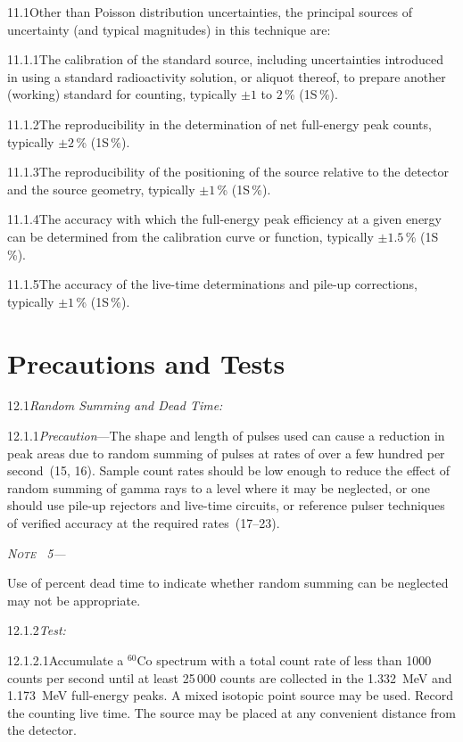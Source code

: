 \documentclass[12pt]{article}
\newenvironment{astmnote}[1][\relax]{%
  \par\smallskip\noindent\textit{N\textsc{ote}%
  \ifx#1\relax\else~#1\fi---}\ignorespaces
}{%
  \par\smallskip
}
\begin{document}
11.1\quad Other than Poisson distribution uncertainties, the principal sources of
uncertainty (and typical magnitudes) in this technique are:

11.1.1\quad The calibration of the standard source, including uncertainties introduced in
using a standard radioactivity solution, or aliquot thereof, to prepare another (working)
standard for counting, typically $\pm 1$ to $2$\,\% (1S\,\%).

11.1.2\quad The reproducibility in the determination of net full-energy peak counts,
typically $\pm 2$\,\% (1S\,\%).

11.1.3\quad The reproducibility of the positioning of the source relative to the detector
and the source geometry, typically $\pm 1$\,\% (1S\,\%).

11.1.4\quad The accuracy with which the full-energy peak efficiency at a given energy can
be determined from the calibration curve or function, typically $\pm 1.5$\,\% (1S\,\%).

11.1.5\quad The accuracy of the live-time determinations and pile-up corrections,
typically $\pm 1$\,\% (1S\,\%).

\section{Precautions and Tests}

12.1\quad \textit{Random Summing and Dead Time:}

12.1.1\quad \textit{Precaution}---The shape and length of pulses used can cause a
reduction in peak areas due to random summing of pulses at rates of over a few hundred
per second~(15, 16). Sample count rates should be low enough to reduce the effect of
random summing of gamma rays to a level where it may be neglected, or one should use
pile-up rejectors and live-time circuits, or reference pulser techniques of verified
accuracy at the required rates~(17--23).

\begin{astmnote}[5]
Use of percent dead time to indicate whether random summing can be neglected may not be
appropriate.
\end{astmnote}

12.1.2\quad \textit{Test:}

12.1.2.1\quad Accumulate a $^{60}$Co spectrum with a total count rate of less than 1000
counts per second until at least 25\,000 counts are collected in the 1.332~MeV and
1.173~MeV full-energy peaks. A mixed isotopic point source may be used. Record the
counting live time. The source may be placed at any convenient distance from the
detector.
\end{document}
